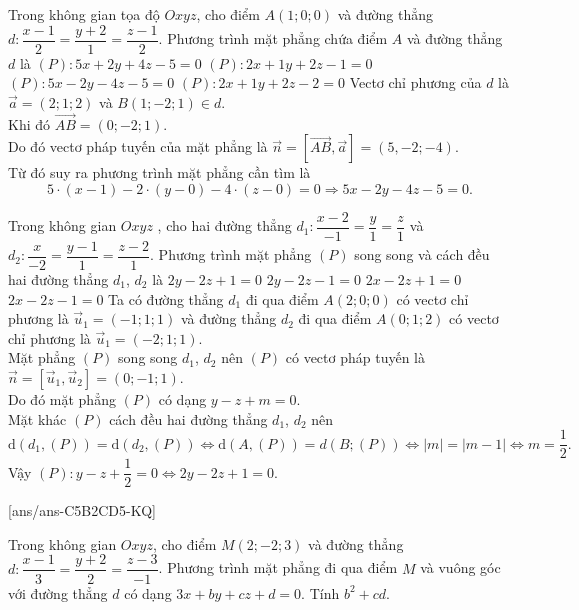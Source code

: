 \begin{ex}%
	Trong không gian tọa độ $ Oxyz$, cho điểm $A(1;0;0)$ và đường thẳng  $ d\colon\dfrac{x-1}{2}=\dfrac{y+2}{1}=\dfrac{z-1}{2}$. Phương trình mặt phẳng chứa điểm $A$ và đường thẳng $d$ là
	\choice
	{$(P)\colon 5x+2y+4z-5=0$}
	{$(P)\colon 2x+1y+2z-1=0$}
	{\True $(P)\colon 5x-2y-4z-5=0$}
	{$(P)\colon 2x+1y+2z-2=0$}
	\loigiai
	{
		Vectơ chỉ phương của $ d$ là $\overrightarrow{a}=(2; 1; 2)$ và $ B(1; -2; 1)\in d$.\\
		Khi đó $\overrightarrow{AB}=(0; -2; 1)$.\\
		Do đó vectơ pháp tuyến của mặt phẳng là $\overrightarrow{n}=\left[\overrightarrow{AB},\overrightarrow{a}\right]=(5,-2;-4)$.\\
		Từ đó suy ra phương trình mặt phẳng cần tìm là $$ 5\cdot(x-1)-2\cdot(y-0)-4\cdot(z-0)=0\Rightarrow 5x-2y-4z-5=0.$$}
\end{ex}

\begin{ex}%
	Trong không gian $Oxyz$ , cho hai đường thẳng $d_1\colon\dfrac{x-2}{-1}=\dfrac{y}{1}=\dfrac{z}{1}$ và $d_2\colon\dfrac{x}{-2}=\dfrac{y-1}{1}=\dfrac{z-2}{1}$. Phương trình mặt phẳng $(P)$ song song và cách đều hai đường thẳng $d_1$, ${d_2}$ là
	\choice
	{\True $ 2y-2z+1=0$}
	{$ 2y-2z-1=0$}
	{$2x-2z+1=0$}
	{$2x-2z-1=0$}
	\loigiai
	{
		Ta có đường thẳng $d_1$ đi qua điểm $ A(2;0;0)$ có vectơ chỉ phương là $\overrightarrow{u}_1=(-1;1;1)$ và đường thẳng $d_2$ đi qua điểm $ A(0;1;2)$ có vectơ chỉ phương là $\overrightarrow{u}_1=(-2; 1; 1)$.\\
		Mặt phẳng $(P)$ song song $d_1$, ${d_2}$ nên $(P)$ có vectơ pháp tuyến là $\overrightarrow{n}=\left[\overrightarrow{u}_1,\overrightarrow{u}_2\right]=(0;-1;1)$.\\
		Do đó mặt phẳng $(P)$ có dạng $ y-z+m=0$.\\
		Mặt khác $(P)$ cách đều hai đường thẳng $d_1$, ${d_2}$ nên\\
		$$ \mathrm{d}\left(d_1,(P)\right)=\mathrm{d}\left(d_2,(P)\right)\Leftrightarrow \mathrm{d}\left(A,(P)\right)=d\left(B;(P)\right)\Leftrightarrow\left| m\right|=\left| m-1\right|\Leftrightarrow m=\dfrac{1}{2}.$$
		Vậy $(P)\colon y-z+\dfrac{1}{2}=0\Leftrightarrow 2y-2z+1=0$.}
\end{ex}
\TNSA
{}[ans/ans-C5B2CD5-KQ]
\begin{ex}%
	Trong không gian $Oxyz$, cho điểm $M(2; -2; 3)$ và đường thẳng  $d\colon \dfrac{x-1}{3}=\dfrac{y+2}{2}=\dfrac{z-3}{-1}$. Phương trình mặt phẳng đi qua điểm $M$ và vuông góc với đường thẳng $d$ có dạng $3x+by+cz+d=0$. Tính $b^2+cd$.
\end{ex}

